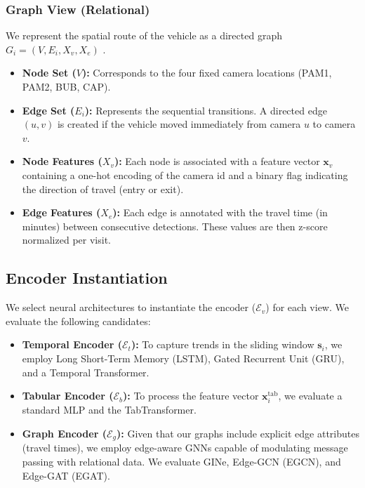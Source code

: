 \documentclass[journal]{IEEEtran}
\begin{document}
\subsubsection{Graph View (Relational)}
We represent the spatial route of the vehicle as a directed graph $G_i = (V, E_i, X_v, X_e)$ \cite{duran2025route}.
\begin{itemize}
    \item \textbf{Node Set ($V$):} Corresponds to the four fixed camera locations (PAM1, PAM2, BUB, CAP).
    \item \textbf{Edge Set ($E_i$):} Represents the sequential transitions. A directed edge $(u, v)$ is created if the vehicle moved immediately from camera $u$ to camera $v$.
    \item \textbf{Node Features ($X_v$):} Each node is associated with a feature vector $\mathbf{x}_v$ containing a one-hot encoding of the camera id and a binary flag indicating the direction of travel (entry or exit).
    \item \textbf{Edge Features ($X_e$):} Each edge is annotated with the travel time (in minutes) between consecutive detections. These values are then z-score normalized per visit.
\end{itemize}


\subsection{Encoder Instantiation} \label{sec:encoder_instantiation}

We select neural architectures to instantiate the encoder ($\mathcal{E}_v$) for each view. We evaluate the following candidates:

\begin{itemize}
    \item \textbf{Temporal Encoder ($\mathcal{E}_t$):} To capture trends in the sliding window $\mathbf{s}_i$, we employ Long Short-Term Memory (LSTM), Gated Recurrent Unit (GRU), and a Temporal Transformer.     
    \item \textbf{Tabular Encoder ($\mathcal{E}_b$):} To process the feature vector $\mathbf{x}_i^{\text{tab}}$, we evaluate a standard MLP and the TabTransformer.
    \item \textbf{Graph Encoder ($\mathcal{E}_g$):} Given that our graphs include explicit edge attributes (travel times), we employ edge-aware GNNs capable of modulating message passing with relational data. We evaluate GINe, Edge-GCN (EGCN), and Edge-GAT (EGAT).  
\end{itemize}
\end{document}
